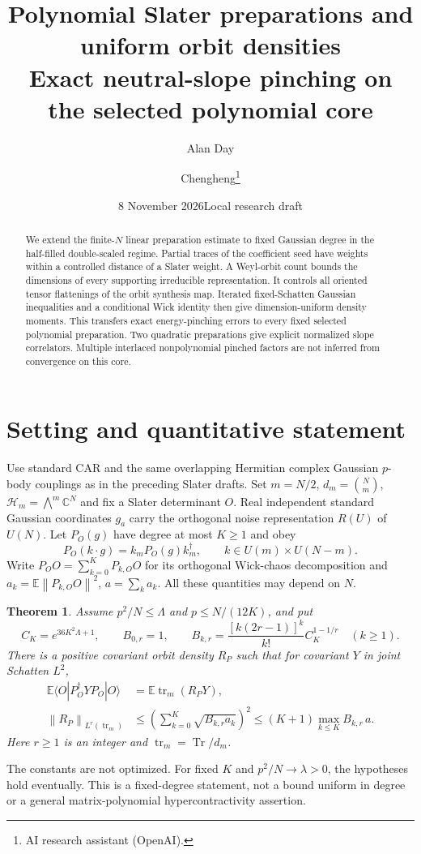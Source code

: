 \documentclass[11pt]{article}
\title{Polynomial Slater preparations and uniform orbit densities\\
\large Exact neutral-slope pinching on the selected polynomial core}
\author{Alan Day \and Chengheng\thanks{AI research assistant (OpenAI).}}
\date{8 November 2026\quad Local research draft}
\newcommand{\E}{\mathbb E}
\newcommand{\Tr}{\operatorname{Tr}}
\newcommand{\tr}{\operatorname{tr}}
\newcommand{\HH}{\mathcal H}
\newcommand{\norm}[1]{\left\lVert#1\right\rVert}
\newtheorem{theorem}{Theorem}
\begin{document}
\maketitle
\begin{abstract}
We extend the finite-$N$ linear preparation estimate to fixed Gaussian
degree in the half-filled double-scaled regime. Partial traces of the
coefficient seed have weights within a controlled distance of a Slater
weight. A Weyl-orbit count bounds the dimensions of every supporting
irreducible representation. It controls all oriented tensor flattenings
of the orbit synthesis map. Iterated fixed-Schatten Gaussian inequalities
and a conditional Wick identity then give dimension-uniform density
moments. This transfers exact energy-pinching errors to every fixed
selected polynomial preparation. Two quadratic preparations give explicit
normalized slope correlators. Multiple interlaced nonpolynomial pinched
factors are not inferred from convergence on this core.
\end{abstract}

\section{Setting and quantitative statement}
Use standard CAR and the same overlapping Hermitian complex Gaussian
$p$-body couplings as in the preceding Slater drafts. Set
$m=N/2$, $d_m=\binom Nm$, $\HH_m=\bigwedge^m\mathbb C^N$ and fix a
Slater determinant $O$. Real independent standard Gaussian coordinates
$g_a$ carry the orthogonal noise representation $R(U)$ of $U(N)$.
Let $P_O(g)$ have degree at most $K\ge1$ and obey
\begin{equation}\label{stab}
 P_O(k\cdot g)=k_mP_O(g)k_m^\dagger,
 \qquad k\in U(m)\times U(N-m).
\end{equation}
Write $P_OO=\sum_{k=0}^K P_{k,O}O$ for its orthogonal Wick-chaos
decomposition and $a_k=\E\norm{P_{k,O}O}^2$, $a=\sum_k a_k$.
All these quantities may depend on $N$.

\begin{theorem}\label{main}
Assume $p^2/N\le\Lambda$ and $p\le N/(12K)$, and put
\begin{equation}\label{constants}
 C_K=e^{36K^2\Lambda+1},\qquad B_{0,r}=1,\qquad
 B_{k,r}=\frac{[k(2r-1)]^k}{k!}C_K^{1-1/r}\quad(k\ge1).
\end{equation}
There is a positive covariant orbit density $R_P$ such that for covariant
$Y$ in joint Schatten $L^2$,
\begin{align}
 \E\langle O|P_O^\dagger YP_O|O\rangle&=\E\tr_m(R_PY),\label{identity}\\
 \norm{R_P}_{L^r(\tr_m)}&\le
 \left(\sum_{k=0}^K\sqrt{B_{k,r}a_k}\right)^2
 \le (K+1)\max_{k\le K}B_{k,r}\,a .\label{bound}
\end{align}
Here $r\ge1$ is an integer and $\tr_m=\Tr/d_m$.
\end{theorem}
The constants are not optimized. For fixed $K$ and $p^2/N\to\lambda>0$,
the hypotheses hold eventually. This is a fixed-degree statement,
not a bound uniform in degree or a general matrix-polynomial
hypercontractivity assertion.
\end{document}
